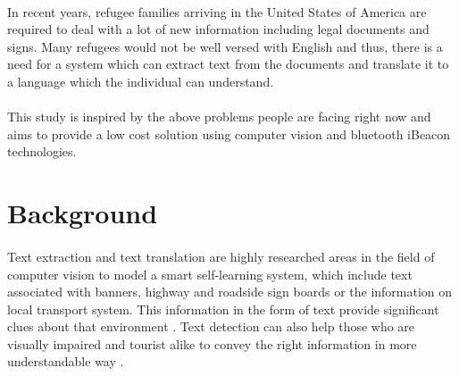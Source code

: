 \documentclass[12pt]{article}
\begin{document}
\paragraph{} In recent years, refugee families arriving in the United States of America are required to deal with a lot of new information including legal documents and signs. Many refugees would not be well versed with English and thus, there is a need for a system which can extract text from the documents and translate it to a language which the individual can understand. 

\paragraph{}This study is inspired by the above problems people are facing right now and aims to provide a low cost solution using computer vision and bluetooth iBeacon technologies.




\section{Background}
\label{sect-background}

\paragraph{}Text extraction and text translation are highly researched areas in the field of computer vision to model a smart self-learning system, which include text associated with banners, highway and roadside sign boards or the information on local transport system. This information in the form of text provide significant clues about that environment \cite{india}. Text detection can also help those who are visually impaired and tourist alike to convey the right information in more understandable way \cite{india}.
\end{document}
